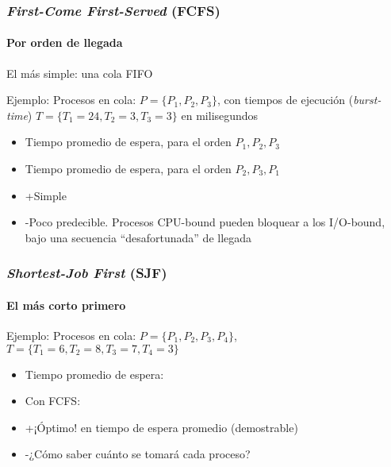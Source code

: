 \documentclass[letter]{beamer}
\begin{document}
\begin{frame}
  \frametitle{{\em First-Come First-Served} (FCFS)}
  \framesubtitle{Por orden de llegada}
  
  El más simple: una cola FIFO

  Ejemplo: Procesos en cola: $P=\{P_1,P_2,P_3\}$, con tiempos de ejecución ({\em burst-time})
           $T=\{T_1=24,T_2=3,T_3=3\}$ en milisegundos
           
  \begin{itemize}
    \item Tiempo promedio de espera, para el orden $P_1, P_2, P_3$ 
    \item Tiempo promedio de espera, para el orden $P_2, P_3, P_1$ 
  \end{itemize}

  \begin{itemize}
    \item<4-> +Simple
    \item<4-> -Poco predecible. Procesos CPU-bound pueden bloquear a los I/O-bound,
           bajo una secuencia ``desafortunada'' de llegada
  \end{itemize}

\end{frame}

\begin{frame}
  \frametitle{{\em Shortest-Job First} (SJF)}
  \framesubtitle{El más corto primero}

  Ejemplo: Procesos en cola: $P=\{P_1,P_2,P_3,P_4\}$, 
           $T=\{T_1=6,T_2=8,T_3=7,T_4=3\}$

  \begin{itemize}
    \item Tiempo promedio de espera: 
    \item<3->Con FCFS: 
  \end{itemize}

  \begin{itemize}
    \item<4-> +¡Óptimo! en tiempo de espera promedio (demostrable)
    \item<4-> -¿Cómo saber cuánto se tomará cada proceso?
  \end{itemize}

\end{frame}
\end{document}

